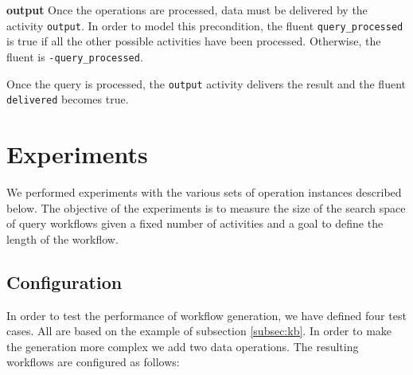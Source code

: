 \documentclass{acm_proc_article-sp}
\begin{document}

                    
\textbf{output} Once the operations are processed, data must be delivered by the activity \texttt{output}. In order to model this precondition, the fluent \texttt{query\_processed} is true if all the other possible activities have been processed. Otherwise, the fluent is \texttt{-query\_processed}.

%



Once the query is processed, the \texttt{output} activity delivers the result and the fluent \texttt{delivered} becomes true.

%



\section{Experiments} \label{sec:experiments} We performed experiments with the various sets of operation instances described below. The objective of the experiments is to measure the size of the search space of query workflows given a fixed number of activities and a goal to define the length of the workflow.

\subsection{Configuration} In order to test the performance of workflow generation, we have defined four test cases. All are based on the example of subsection \ref{subsec:kb}. In order to make the generation more complex we add two data operations. The resulting workflows are configured as follows:
\end{document}
